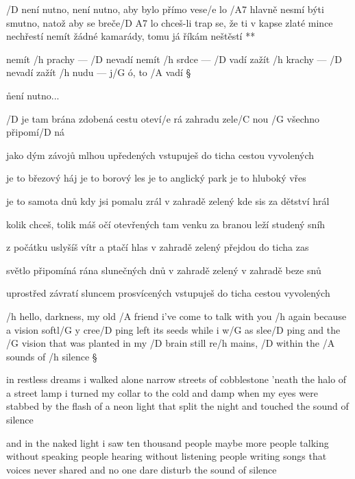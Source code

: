 
\R  /D není nutno, není nutno, aby bylo přímo vese/e lo
    /A7 hlavně nesmí býti smutno, natož aby se breče/{D A7} lo \s
    chceš-li trap se, že ti v kapse zlaté mince nechřestí
    nemít žádné kamarády, tomu já říkám neštěstí **

nemít /h prachy --- /D nevadí
nemít /h srdce --- /D vadí
zažít /h krachy --- /D nevadí
zažít /h nudu --- j/G ó, to /A vadí \S

\r není nutno...




/D je tam brána zdobená
cestu oteví/e rá
zahradu zele/C nou
/G všechno připomí/D ná \s

jako dým závojů
mlhou upředených
vstupuješ do ticha
cestou vyvolených \s

je to březový háj
je to borový les
je to anglický park
je to hluboký vřes \s

je to samota dnů
kdy jsi pomalu zrál
v zahradě zelený
kde sis za dětství hrál \s

kolik chceš, tolik máš
očí otevřených
tam venku za branou
leží studený sníh \s

z počátku uslyšíš
vítr a ptačí hlas
v zahradě zelený
přejdou do ticha zas \s

světlo připomíná
rána slunečných dnů
v zahradě zelený
v zahradě beze snů \s

uprostřed závratí
sluncem prosvícených
vstupuješ do ticha
cestou vyvolených




/h hello, darkness, my old /A friend
i've come to talk with you /h again
because a vision softl/G y cree/D ping
left its seeds while i w/G as slee/D ping
and the /G vision that was planted in my /D brain
still re/h mains, /D within the /A sounds of /h silence \S

in restless dreams i walked alone
narrow streets of cobblestone
'neath the halo of a street lamp
i turned my collar to the cold and damp
when my eyes were stabbed by the flash of a neon light
that split the night and touched the sound of silence \s

and in the naked light i saw
ten thousand people maybe more
people talking without speaking
people hearing without listening
people writing songs that voices never shared
and no one dare disturb the sound of silence \s

